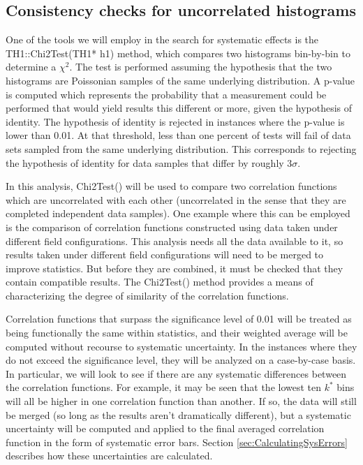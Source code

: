 \subsection{Consistency checks for uncorrelated histograms}
\label{sec:ConsistencyCheckUncorrelated}
One of the tools we will employ in the search for systematic effects is the TH1::Chi2Test(TH1* h1) method, which compares two histograms bin-by-bin to determine a $\chi^2$.  The test is performed assuming the hypothesis that the two histograms are Poissonian samples of the same underlying distribution.  A p-value is computed which represents the probability that a measurement could be performed that would yield results this different or more, given the hypothesis of identity.  The hypothesis of identity is rejected in instances where the p-value is lower than 0.01. At that threshold, less than one percent of tests will fail of data sets sampled from the same underlying distribution.  This corresponds to rejecting the hypothesis of identity for data samples that differ by roughly $3 \sigma$.

In this analysis, Chi2Test() will be used to compare two correlation functions which are uncorrelated with each other (uncorrelated in the sense that they are completed independent data samples).  One example where this can be employed is the comparison of correlation functions constructed using data taken under different field configurations.  This analysis needs all the data available to it, so results taken under different field configurations will need to be merged to improve statistics.  But before they are combined, it must be checked that they contain compatible results.  The Chi2Test() method provides a means of characterizing the degree of similarity of the correlation functions.  

Correlation functions that surpass the significance level of 0.01 will be treated as being functionally the same within statistics, and their weighted average will be computed without recourse to systematic uncertainty. In the instances where they do not exceed the significance level, they will be analyzed on a case-by-case basis.  In particular, we will look to see if there are any systematic differences between the correlation functions.  For example, it may be seen that the lowest ten $k^*$ bins will all be higher in one correlation function than another.  If so, the data will still be merged (so long as the results aren't dramatically different), but a systematic uncertainty will be computed and applied to the final averaged correlation function in the form of systematic error bars.  Section \ref{sec:CalculatingSysErrors} describes how these uncertainties are calculated.  


